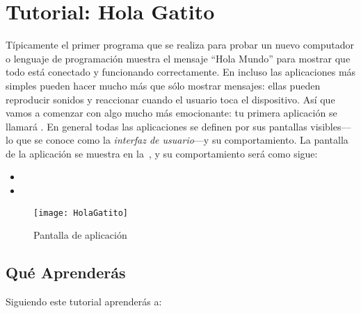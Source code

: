 \section{Tutorial: Hola Gatito}
\label{sec:tutor-hola-gatito}

Típicamente el primer programa que se realiza para probar un nuevo
computador o lenguaje de programación muestra el mensaje ``Hola
Mundo'' para mostrar que todo está conectado y funcionando
correctamente. En \AppInventor incluso las aplicaciones más simples
pueden hacer mucho más que sólo mostrar mensajes: ellas pueden
reproducir sonidos y reaccionar cuando el usuario toca el
dispositivo. Así que vamos a comenzar con algo mucho más emocionante:
tu primera aplicación se llamará . En general
todas las aplicaciones se definen por sus pantallas visibles---lo que
se conoce como la \textit{interfaz de usuario}---y su
comportamiento. La pantalla de la aplicación se muestra en
la~, y su comportamiento será como sigue:

\begin{itemize}
\item {}
\item {}
\end{itemize}

\begin{figure}[H]
\centering
\texttt{[image: HolaGatito]}
\caption{Pantalla de aplicación }
\label{fig:holaGatito}
\end{figure}

\subsection*{Qué Aprenderás}

Siguiendo este tutorial aprenderás a:

